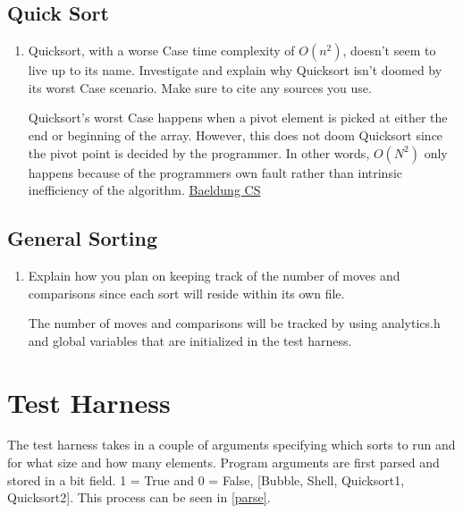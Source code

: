 \documentclass[12pt]{article}
\newenvironment{QandA}{\begin{enumerate}[label=\bfseries\alph*.]\bfseries}
{\end{enumerate}}
\newenvironment{answered}{\par\normalfont}{}
\begin{document}
    \subsection{Quick Sort}
    \begin{QandA}
    \item Quicksort, with a worse Case time complexity of $O(n^2)$, doesn’t seem to live up to its name. Investigate and explain why Quicksort isn’t doomed by its worst Case scenario. Make sure to cite any sources you use.
        \begin{answered}
            Quicksort's worst Case happens when a pivot element is picked at either the end or beginning of the array. However, this does not doom Quicksort since the pivot point is decided by the programmer. In other words, $O(N^2)$ only happens because of the programmers own fault rather than intrinsic inefficiency of the algorithm. \href{https://www.baeldung.com/cs/quicksort-time-complexity-worst-Case}{Baeldung CS}
        \end{answered}


    \end{QandA}

    \subsection{General Sorting}
    \begin{QandA}
    \item Explain how you plan on keeping track of the number of moves and comparisons since each sort will reside within its own file.
        \begin{answered}
            The number of moves and comparisons will be tracked by using analytics.h and global variables that are initialized in the test harness.
        \end{answered}


    \end{QandA}


    \section{Test Harness}

	The test harness takes in a couple of arguments specifying which sorts to run and for what size and how many elements. Program arguments are first parsed and stored in a bit field. 1 = True and 0 = False, [Bubble, Shell, Quicksort1, Quicksort2]. This process can be seen in \vref{parse}.
\end{document}
